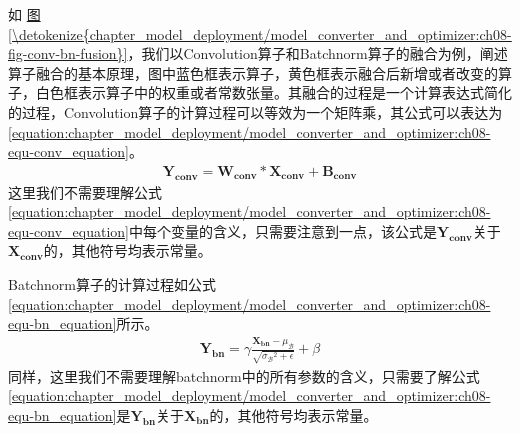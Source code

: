 \documentclass[letterpaper,10pt,english]{sphinxmanual}
\begin{document}
\sphinxAtStartPar
如
\hyperref[\detokenize{chapter_model_deployment/model_converter_and_optimizer:ch08-fig-conv-bn-fusion}]{图\ref{\detokenize{chapter_model_deployment/model_converter_and_optimizer:ch08-fig-conv-bn-fusion}}}，我们以Convolution算子和Batchnorm算子的融合为例，阐述算子融合的基本原理，图中蓝色框表示算子，黄色框表示融合后新增或者改变的算子，白色框表示算子中的权重或者常数张量。其融合的过程是一个计算表达式简化的过程，Convolution算子的计算过程可以等效为一个矩阵乘，其公式可以表达为
\eqref{equation:chapter_model_deployment/model_converter_and_optimizer:ch08-equ-conv_equation}。
\begin{equation}\label{equation:chapter_model_deployment/model_converter_and_optimizer:ch08-equ-conv_equation}
\begin{split}\pmb{Y_{conv}}=\pmb{W_{conv}}*\pmb{X_{conv}}+\pmb{B_{conv}}\end{split}
\end{equation}
\sphinxAtStartPar
这里我们不需要理解公式
\eqref{equation:chapter_model_deployment/model_converter_and_optimizer:ch08-equ-conv_equation}中每个变量的含义，只需要注意到一点，该公式是\(\pmb{Y_{conv}}\)关于\(\pmb{X_{conv}}\)的，其他符号均表示常量。

\sphinxAtStartPar
Batchnorm算子的计算过程如公式 \eqref{equation:chapter_model_deployment/model_converter_and_optimizer:ch08-equ-bn_equation}所示。
\begin{equation}\label{equation:chapter_model_deployment/model_converter_and_optimizer:ch08-equ-bn_equation}
\begin{split}\pmb{Y_{bn}}=\gamma\frac{\pmb{X_{bn}}-\mu_{\mathcal{B}}}{\sqrt{{\sigma_{\mathcal{B}}}^{2}+\epsilon}}+\beta\end{split}
\end{equation}
\sphinxAtStartPar
同样，这里我们不需要理解batchnorm中的所有参数的含义，只需要了解公式
\eqref{equation:chapter_model_deployment/model_converter_and_optimizer:ch08-equ-bn_equation}是\(\pmb{Y_{bn}}\)关于\(\pmb{X_{bn}}\)的，其他符号均表示常量。
\end{document}

